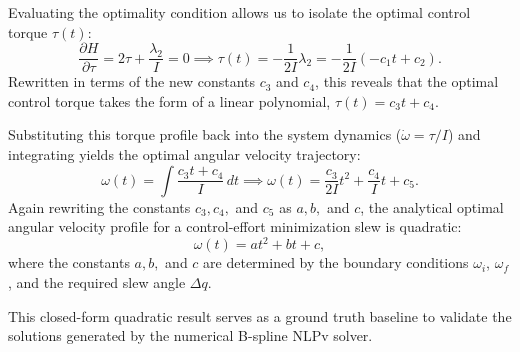 Evaluating the optimality condition allows us to isolate the optimal control torque $\tau(t)$:
\begin{equation}
    \frac{\partial H}{\partial \tau} = 2\tau + \frac{\lambda_2}{I} = 0 \implies \tau(t) = -\frac{1}{2I} \lambda_2 = -\frac{1}{2I}(-c_1 t + c_2).
\end{equation}
Rewritten in terms of the new constants $c_3$ and $c_4$, this reveals that the optimal control torque takes the form of a linear polynomial, $\tau(t) = c_3 t + c_4$.

Substituting this torque profile back into the system dynamics ($\dot{\omega} = \tau/I$) and integrating yields the optimal angular velocity trajectory:
\begin{equation}
    \omega(t) = \int \frac{c_3 t + c_4}{I} \, dt \implies \omega(t) = \frac{c_3}{2I}t^2 + \frac{c_4}{I}t + c_5.
\end{equation}
Again rewriting the constants $c_3, c_4,$ and $c_5$ as $a, b,$ and $c$, the analytical optimal angular velocity profile for a control-effort minimization slew is quadratic:
\begin{equation}
    \omega(t) = at^2 + bt + c,
\end{equation}
where the constants $a, b,$ and $c$ are determined by the boundary conditions $\omega_i$, $\omega_f$, and the required slew angle $\Delta q$. 

This closed-form quadratic result serves as a ground truth baseline to validate the solutions generated by the numerical B-spline \ac{NLPv} solver.
